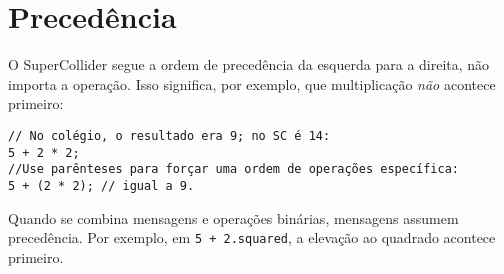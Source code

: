 \section{Precedência}

O SuperCollider segue a ordem de precedência da esquerda para a direita, não importa a operação. Isso significa, por exemplo, que multiplicação \emph{não} acontece primeiro:

\begin{lstlisting}[style=SuperCollider-IDE, basicstyle=\scttfamily\footnotesize]
// No colégio, o resultado era 9; no SC é 14:
5 + 2 * 2; 
//Use parênteses para forçar uma ordem de operações específica:
5 + (2 * 2); // igual a 9.
\end{lstlisting}

Quando se combina mensagens e operações binárias, mensagens assumem precedência. Por exemplo, em \texttt{5 + 2.squared}, a elevação ao quadrado acontece primeiro.
